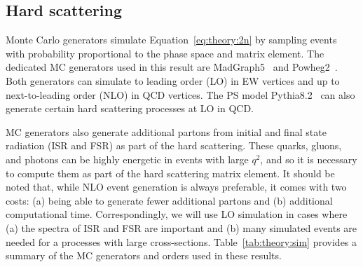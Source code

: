 \subsection{Hard scattering}

Monte Carlo generators simulate Equation~\ref{eq:theory:2n} by sampling events with probability proportional to the phase space and matrix element.
The dedicated MC generators used in this result are MadGraph5~\cite{mg5,fxfx} and Powheg2~\cite{powheg}.
Both generators can simulate to leading order (LO) in EW vertices and up to next-to-leading order (NLO) in QCD vertices.
The PS model Pythia8.2~\cite{pythia} can also generate certain hard scattering processes at LO in QCD.

MC generators also generate additional partons from initial and final state radiation ({ISR} and {FSR}) as part of the hard scattering.
These quarks, gluons, and photons can be highly energetic in events with large $q^2$, and so it is necessary to compute them as part of the hard scattering matrix element.  
It should be noted that, while NLO event generation is always preferable, it comes with two costs: (a) being able to generate fewer additional partons and (b) additional computational time.
Correspondingly, we will use LO simulation in cases where (a) the spectra of ISR and FSR are important and (b) many simulated events are needed for a processes with large cross-sections.
Table~\ref{tab:theory:sim} provides a summary of the MC generators and orders used in these results.

